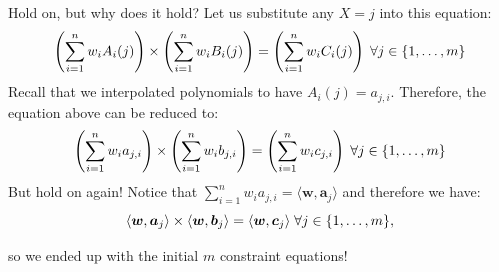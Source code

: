 \documentclass{zkdl-presentation-template}
\begin{document}
    \begin{frame}
        Hold on, but why does it hold? Let us substitute any $X=j$ into this equation:
        \vspace{-5pt}
        \begin{equation*}
            \left( \sum_{i = 1}^{n} w_iA_i(j) \right) \times \left( \sum_{i = 1}^{n} w_iB_i(j) \right) = \left( \sum_{i = 1}^{n} w_iC_i(j) \right) \; \forall j \in \{1,\dots,m\}
            \vspace{-5pt}
        \end{equation*}
        \pause
        Recall that we interpolated polynomials to have $A_i(j) = a_{j,i}$. Therefore, the equation above can be reduced to:
        \vspace{-5pt}
        \begin{equation*}
            \left( \sum_{i = 1}^{n} w_ia_{j,i} \right) \times \left( \sum_{i = 1}^{n} w_ib_{j,i} \right) = \left( \sum_{i = 1}^{n} w_ic_{j,i} \right) \; \forall j \in \{1,\dots,m\}
            \vspace{-5pt}
        \end{equation*}
        \pause
        But hold on again! Notice that $\sum_{i = 1}^{n} w_ia_{j,i} = \langle \boldsymbol{w}, \boldsymbol{a}_j \rangle$ and therefore we have:
        \vspace{-5pt}
        \begin{equation*}
            \langle \boldsymbol{w}, \boldsymbol{a}_j \rangle \times \langle \boldsymbol{w}, \boldsymbol{b}_j \rangle = \langle \boldsymbol{w}, \boldsymbol{c}_j \rangle \; \forall j \in \{1,\dots,m\},
            \vspace{-5pt}
        \end{equation*}
        
        so we ended up with the initial $m$ constraint equations!       
    \end{frame}
\end{document}
